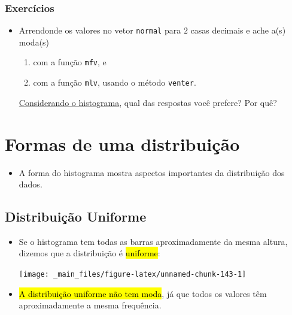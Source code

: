 \documentclass[
  11pt]{report}
\providecommand{\tightlist}{%
  \setlength{\itemsep}{0pt}\setlength{\parskip}{0pt}}
\begin{document}
\hypertarget{exercuxedcios-5}{%
\subsubsection{Exercícios}\label{exercuxedcios-5}}

\begin{itemize}
\item
  Arrendonde os valores no vetor \texttt{normal} para $2$ casas decimais e ache a(s) moda(s)

  \begin{enumerate}
  \def\labelenumi{\arabic{enumi}.}
  \item
    com a função \texttt{mfv}, e
  \item
    com a função \texttt{mlv}, usando o método \texttt{venter}.
  \end{enumerate}

  \protect\hyperlink{dados-normais}{Considerando o histograma}, qual das respostas você prefere? Por quê?
\end{itemize}

\hypertarget{formas-de-uma-distribuiuxe7uxe3o}{%
\section{Formas de uma distribuição}\label{formas-de-uma-distribuiuxe7uxe3o}}

\begin{itemize}
\tightlist
\item
  A forma do histograma mostra aspectos importantes da distribuição dos dados.
\end{itemize}

\hypertarget{distribuiuxe7uxe3o-uniforme}{%
\subsection{Distribuição Uniforme}\label{distribuiuxe7uxe3o-uniforme}}

\begin{itemize}
\item
  Se o histograma tem todas as barras aproximadamente da mesma altura, dizemos que a distribuição é {\hl{uniforme}}:

  \begin{center}\texttt{[image: \_main\_files/figure-latex/unnamed-chunk-143-1]} \end{center}
\item
  {\hl{A distribuição uniforme não tem moda}}, já que todos os valores têm aproximadamente a mesma frequência.
\end{itemize}
\end{document}
